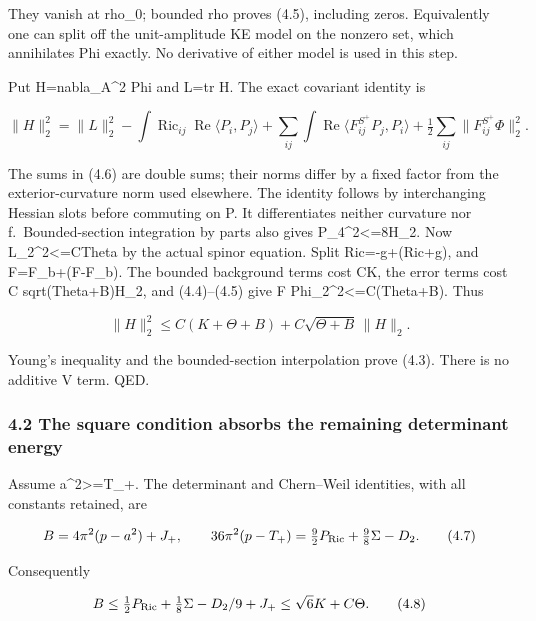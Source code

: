 \documentclass[
  10pt,
]{article}
\begin{document}
They vanish at rho\_0; bounded rho proves (4.5), including zeros.
Equivalently one can split off the unit-amplitude KE model on the
nonzero set, which annihilates Phi exactly. No derivative of either
model is used in this step.

Put H=nabla\_A\^{}2 Phi and L=tr H. The exact covariant identity is

\[
 \|H\|_2^2=\|L\|_2^2
 -\int\operatorname{Ric}_{ij}\operatorname{Re}\langle P_i,P_j\rangle
 +\sum_{ij}\int\operatorname{Re}\langle F_{ij}^{S^+}P_j,P_i\rangle
 +\tfrac12\sum_{ij}\|F_{ij}^{S^+}\Phi\|_2^2.         \tag{4.6}
\]

The sums in (4.6) are double sums; their norms differ by a fixed factor
from the exterior-curvature norm used elsewhere. The identity follows by
interchanging Hessian slots before commuting on P. It differentiates
neither curvature nor f.~Bounded-section integration by parts also gives
\textbar\textbar P\textbar\textbar\_4\^{}2\textless=8\textbar\textbar H\textbar\textbar\_2.
Now \textbar\textbar L\textbar\textbar\_2\^{}2\textless=CTheta by the
actual spinor equation. Split Ric=-g+(Ric+g), and F=F\_b+(F-F\_b). The
bounded background terms cost CK, the error terms cost C
sqrt(Theta+B)\textbar\textbar H\textbar\textbar\_2, and (4.4)--(4.5)
give \textbar\textbar F Phi\textbar\textbar\_2\^{}2\textless=C(Theta+B).
Thus

\[
 \|H\|_2^2\le C(K+\Theta+B)
                 +C\sqrt{\Theta+B}\,\|H\|_2.
\]

Young's inequality and the bounded-section interpolation prove (4.3).
There is no additive V term. QED.

\hypertarget{the-square-condition-absorbs-the-remaining-determinant-energy}{%
\subsubsection{4.2 The square condition absorbs the remaining
determinant
energy}\label{the-square-condition-absorbs-the-remaining-determinant-energy}}

Assume a\^{}2\textgreater=T\_+. The determinant and Chern--Weil
identities, with all constants retained, are

\[
 B=4\pi^2(p-a^2)+J_+,
 \qquad
 36\pi^2(p-T_+)=\tfrac92P_{\rm Ric}+\tfrac98\Sigma-D_2.
                                                               \tag{4.7}
\]

Consequently

\[
 B\le\tfrac12P_{\rm Ric}+\tfrac18\Sigma-D_2/9+J_+
       \le\sqrt6 K+C\Theta.                          \tag{4.8}
\]
\end{document}
